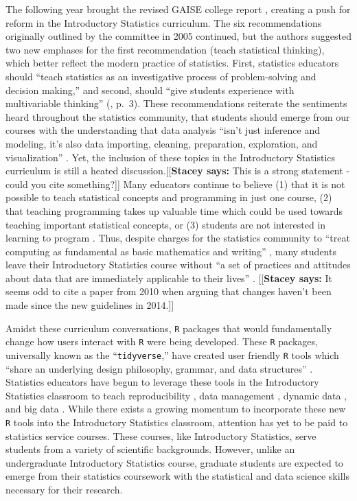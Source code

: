 \documentclass[12pt]{article}
\newcommand{\stacey}[1]{{\color{purple}[[\textbf{Stacey says: }#1]]}}
\begin{document}
\quad The following year brought the revised GAISE college report 
\citep{gaise}, creating a push for reform in the Introductory Statistics 
curriculum. The six recommendations originally outlined by the committee in 2005
continued, but the authors suggested two new emphases for the first
recommendation (teach statistical thinking), which better reflect the modern
practice of statistics. First, statistics educators should ``teach statistics as
an investigative process of problem-solving and decision making,'' and second, should 
``give students experience with multivariable thinking'' (\citeyear{gaise}, 
p.\ 3). These recommendations reiterate the sentiments heard throughout the
statistics community, that students should emerge from our courses with the
understanding that data analysis ``isn't just inference and modeling, it's also
data importing, cleaning, preparation, exploration, and visualization'' 
\citep{mine-jsm}. Yet, the inclusion of these topics in the Introductory 
Statistics curriculum is still a heated discussion.\stacey{This is a strong statement -
could you cite something?} Many educators continue to 
believe (1) that it is not possible to teach statistical concepts and 
programming in just one course, (2) that teaching programming takes up valuable
time which could be used towards teaching important statistical concepts, or 
(3) students are not interested in learning to program \citep{mine-jsm}. Thus, 
despite charges for the statistics community to ``treat computing as fundamental
as basic mathematics and writing'' \citep[p.\ 298]{esr}, many students leave
their Introductory Statistics course without ``a set of practices and attitudes
about data that are immediately applicable to their lives'' 
\citep[p.\ 309]{gould}. \stacey{It seems odd to cite a paper from 2010 when
arguing that changes haven't been made since the new guidelines in 2014.}

\quad Amidst these curriculum conversations, \texttt{R} packages that
would fundamentally change how users interact with \texttt{R} were being developed. These 
\texttt{R} packages, universally known as the ``\texttt{tidyverse},'' have 
created user friendly \texttt{R} tools which ``share an underlying design 
philosophy, grammar, and data structures'' \citep{tidyverse}. Statistics 
educators have begun to leverage these tools in the Introductory Statistics 
classroom to teach reproducibility \citep{mine-rmarkdown}, data management 
\citep{horton_takingachance}, dynamic data \citep{hardin-tise}, and big data
\citep{horton-tise}. While there exists a growing momentum to incorporate these
new \texttt{R} tools into the Introductory Statistics classroom, attention has 
yet to be paid to statistics service courses. These courses, like Introductory 
Statistics, serve students from a variety of scientific backgrounds. 
However, unlike an undergraduate Introductory Statistics course, graduate students are 
expected to emerge from their statistics coursework with the statistical and 
data science skills necessary for their research. 
\end{document}
